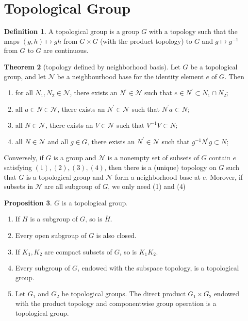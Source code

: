 \documentclass[12pt,a4paper]{book}
\newenvironment{enu}{\begin{enumerate}[(1)]}{\end{enumerate}}
\theoremstyle{definition}
\newtheorem{defn}{Definition}[section]
\newtheorem{theo}[defn]{Theorem}
\newtheorem{prop}[defn]{Proposition}
\begin{document}
\section{Topological Group}
\begin{defn}
    A topological group is a group $G$ with a topology such that the maps $(g, h) \mapsto g h$ from $G \times G$ (with the product topology) to $G$ and $g \mapsto g^{-1}$ from $G$ to $G$ are continuous.
\end{defn}
\begin{theo}[topology defined by neighborhood basis]
    Let $G$ be a topological group, and let $\mathcal{N}$ be a neighbourhood base for the identity element $e$ of $G$. Then
    \begin{enumerate}[(1)]
        \item for all $N_1, N_2 \in \mathcal{N}$, there exists an $N^{\prime} \in \mathcal{N}$ such that $e \in N^{\prime} \subset N_1 \cap N_2$;
        \item all $a\in N \in \mathcal{N}$, there exists an $N^{\prime} \in \mathcal{N}$ such that $N^{\prime}a \subset N$;
        \item all $N \in \mathcal{N}$, there exists an $V \in \mathcal{N}$ such that $V^{-1}V \subset N$;
        \item all $N \in \mathcal{N}$ and all $g \in G$, there exists an $N^{\prime} \in \mathcal{N}$ such that $g^{-1}N^{\prime}g \subset N$;
    \end{enumerate}
    Conversely, if $G$ is a group and $\mathcal{N}$ is a nonempty set of subsets of $G$ contain $e$ satisfying $(1), (2), (3), (4)$, then there is a (unique) topology on $G$ such that $G$ is a topological group and $\mathcal{N}$ form a neighborhood base at $e$.
    Morover, if subsets in $\mathcal{N}$ are all subgroup of $G$, we only need (1) and (4)
    \label{theorm:topology defined by neighborhood basis}
\end{theo}
\begin{prop}
    $G$ is a topological group.
    \begin{enu}
        \item If $H$ is a subgroup of $G$, so is $\bar{H}$.
        \item Every open subgroup of $G$ is also closed.
        \item If $K_1, K_2$ are compact subsets of $G$, so is $K_1 K_2$.
        \item Every subgroup of $G$, endowed with the subspace topology, is a topological group.
        \item Let $G_1$ and $G_2$ be topological groups. The direct product $G_1 \times G_2$ endowed with the product topology and componentwise group operation is a topological group.
        
    \end{enu}
\end{prop}
\end{document}
